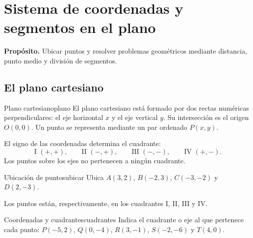 \chapter{Sistema de coordenadas y segmentos en el plano}

\begin{center}
\begin{minipage}{.88\textwidth}
\small\sffamily
\textbf{Propósito.} Ubicar puntos y resolver problemas geométricos mediante
distancia, punto medio y división de segmentos.
\end{minipage}
\end{center}

\section{El plano cartesiano}

\begin{definition}{Plano cartesiano}{plano}
El plano cartesiano está formado por dos rectas numéricas perpendiculares: el
eje horizontal $x$ y el eje vertical $y$. Su intersección es el origen
$O(0,0)$. Un punto se representa mediante un par ordenado $P(x,y)$.
\end{definition}

El signo de las coordenadas determina el cuadrante:
\[
\text{I }(+,+),\qquad \text{II }(-,+),\qquad
\text{III }(-,-),\qquad \text{IV }(+,-).
\]
Los puntos sobre los ejes no pertenecen a ningún cuadrante.

\begin{example}{Ubicación de puntos}{ubicar}
Ubica $A(3,2)$, $B(-2,3)$, $C(-3,-2)$ y $D(2,-3)$.

\begin{center}
\end{center}
Los puntos están, respectivamente, en los cuadrantes I, II, III y IV.
\end{example}

\begin{exercise}{Coordenadas y cuadrantes}{cuadrantes}
Indica el cuadrante o eje al que pertenece cada punto:
$P(-5,2)$, $Q(0,-4)$, $R(3,-1)$, $S(-2,-6)$ y $T(4,0)$.
\end{exercise}

